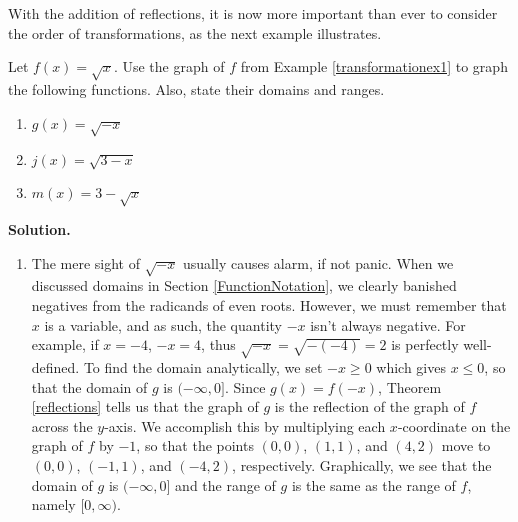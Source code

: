 With the addition of reflections, it is now more important than ever to consider the order of transformations, as the next example illustrates.

\begin{ex} Let $f(x) = \sqrt{x}$.  Use the graph of $f$ from Example \ref{transformationex1} to graph the following functions.  Also, state their domains and ranges.

\enlargethispage{.25in}
\vspace{-.1in}
\begin{multicols}{3}
\begin{enumerate}

\item  $g(x) = \sqrt{-x}$
\item  $j(x) = \sqrt{3-x}$
\item  $m(x) = 3 - \sqrt{x}$

\end{enumerate}
\end{multicols}

\vspace{-.2in}

{\bf Solution.}

\begin{enumerate}

\item  The mere sight of $\sqrt{-x}$ usually causes alarm, if not panic.  When we discussed domains in Section \ref{FunctionNotation}, we clearly banished negatives from the radicands of even roots.  However, we must remember that $x$ is a variable, and as such, the quantity $-x$ isn't always negative. For example, if $x=-4$, $-x = 4$, thus $\sqrt{-x} = \sqrt{-(-4)} = 2$ is perfectly well-defined.  To find the domain analytically, we set $-x \geq 0$ which gives  $x \leq 0$, so that the domain of $g$ is $(-\infty, 0]$.  Since $g(x) = f(-x)$, Theorem \ref{reflections} tells us that the graph of $g$ is the reflection of the graph of $f$ across the $y$-axis.  We accomplish this by multiplying each $x$-coordinate on the graph of $f$ by $-1$, so that the points $(0,0)$, $(1,1)$, and $(4,2)$ move to $(0,0)$, $(-1,1)$, and $(-4,2)$, respectively.  Graphically, we see that the domain of $g$ is $(-\infty, 0]$ and the range of $g$ is the same as the range of $f$, namely $[0,\infty)$.

\[ \begin{array}{ccc}


\end{array}\]
\end{enumerate}
\end{ex}
